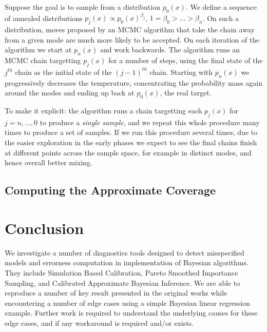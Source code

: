 \documentclass[twoside]{article}
\begin{document}
Suppose the goal is to sample from a distribution $p_0 (x)$. We define a sequence of annealed distributions $p_j (x) \propto p_0 (x)^{\beta_j}$, $1=\beta_0>\dots>\beta_n$. On such a distribution, moves proposed by an MCMC algorithm that take the chain away from a given mode are much more likely to be accepted. On each iteration of the algorithm we start at $p_n(x)$ and work backwards. The algorithm runs an MCMC chain targetting $p_j(x)$ for a number of steps, using the final state of the $j^{th}$ chain as the initial state of the $(j-1)^{th}$ chain. Starting with $p_n(x)$ we progressively decreases the temperature, concentrating the probability mass again around the modes and ending up back at $p_0(x)$, the real target. 

To make it explicit: the algorithm runs a chain targetting each $p_j(x)$ for $j=n,\dots,0$ to produce a \textit{single sample}, and we repeat this whole procedure many times to produce a set of samples. If we run this procedure several times, due to the easier exploration in the early phases we expect to see the final chains finish at different points across the sample space, for example in distinct modes, and hence overall better mixing.

\subsection{Computing the Approximate Coverage}
%

\section{Conclusion}

We investigate a number of diagnostics tools designed to detect misspecified models and errorness computation in implementation of Bayesian algorithms. They include Simulation Based Calibration, Pareto Smoothed Importance Sampling, and Calibrated Approximate Bayesian Inference. We are able to reproduce a number of key result presented in the original works while encountering a number of edge cases using a simple Bayesian linear regression example. Further work is required to understand the underlying causes for these edge cases, and if any workaround is required and/or exists.
\end{document}

